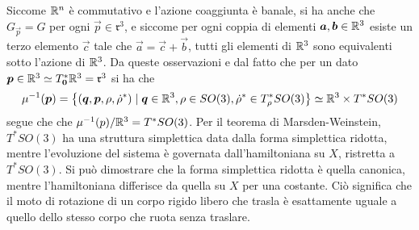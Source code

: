 Siccome $\mathbb{R}^{n}$ è commutativo e l'azione coaggiunta è banale, si ha anche che $G_{\vec{p}} = G$ per ogni $\vec{p} \in \mathfrak{r}^3$, e siccome per ogni coppia di elementi $\boldsymbol{a}, \boldsymbol{b} \in \mathbb{R}^3$ esiste un terzo elemento $\vec{c}$ tale che $\vec{a} = \vec{c} + \vec{b}$, tutti gli elementi di $\mathbb{R}^3$ sono equivalenti sotto l'azione di $\mathbb{R}^3$. Da queste osservazioni e dal fatto che per un dato $\boldsymbol{p} \in \mathbb{R}^3 \simeq T^*_{\boldsymbol{0}} \mathbb{R}^3 = \mathfrak{r}^3$ si ha che
\begin{equation*}
\mu^{-1}(\boldsymbol{p}) = \big\lbrace(\boldsymbol{q},\boldsymbol{p}, \rho, \dot{\rho}^*) \mid \boldsymbol{q}\in \mathbb{R}^3, \rho \in SO(3), \dot{\rho}^* \in T^*_{\rho} SO(3)\big\rbrace \simeq \mathbb{R}^3 \times T^*SO(3)
\end{equation*} 
segue che che $\mu^{-1}(p)/\mathbb{R}^3 = T^*SO(3)$. Per il teorema di Marsden-Weinstein, $T^* SO(3)$ ha una struttura simplettica data dalla forma simplettica ridotta, mentre l'evoluzione del sistema è governata dall'hamiltoniana su $X$, ristretta a $T^* SO(3)$. Si può dimostrare che la forma simplettica ridotta è quella canonica, mentre l'hamiltoniana differisce da quella su $X$ per una costante. Ciò significa che il moto di rotazione di un corpo rigido libero che trasla è esattamente uguale a quello dello stesso corpo che ruota senza traslare.

